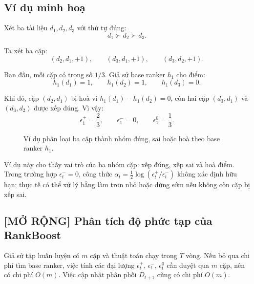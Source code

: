 \subsection{Ví dụ minh hoạ}

Xét ba tài liệu \(d_1,d_2,d_3\) với thứ tự đúng:
\[
    d_1 \succ d_2 \succ d_3.
\]

Ta xét ba cặp:
\[
    (d_2,d_1,+1),
    \qquad
    (d_3,d_1,+1),
    \qquad
    (d_3,d_2,+1).
\]

Ban đầu, mỗi cặp có trọng số \(1/3\). Giả sử base ranker \(h_1\) cho điểm:
\[
    h_1(d_1)=1,
    \qquad
    h_1(d_2)=1,
    \qquad
    h_1(d_3)=0.
\]

Khi đó, cặp \((d_2,d_1)\) bị hoà vì \(h_1(d_1)-h_1(d_2)=0\), còn hai cặp \((d_3,d_1)\) và \((d_3,d_2)\) được xếp đúng. Vì vậy:
\[
    \epsilon_1^{+}=\frac{2}{3},
    \qquad
    \epsilon_1^{-}=0,
    \qquad
    \epsilon_1^{0}=\frac{1}{3}.
\]

\begin{figure}[H]
    \centering
    \caption{Ví dụ phân loại ba cặp thành nhóm đúng, sai hoặc hoà theo base ranker \(h_1\).}
    \label{fig:section5-rankboost-example-table}
\end{figure}

Ví dụ này cho thấy vai trò của ba nhóm cặp: xếp đúng, xếp sai và hoà điểm. Trong trường hợp \(\epsilon_t^{-}=0\), công thức \(\alpha_t=\frac{1}{2}\log(\epsilon_t^{+}/\epsilon_t^{-})\) không xác định hữu hạn; thực tế có thể xử lý bằng làm trơn nhỏ hoặc dừng sớm nếu không còn cặp bị xếp sai.

\subsection{[MỞ RỘNG] Phân tích độ phức tạp của RankBoost}

Giả sử tập huấn luyện có \(m\) cặp và thuật toán chạy trong \(T\) vòng. Nếu bỏ qua chi phí tìm base ranker, việc tính các đại lượng \(\epsilon_t^{+}\), \(\epsilon_t^{-}\), \(\epsilon_t^{0}\) cần duyệt qua \(m\) cặp, nên có chi phí \(O(m)\). Việc cập nhật phân phối \(D_{t+1}\) cũng có chi phí \(O(m)\).

